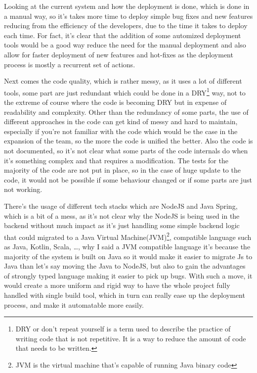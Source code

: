 Looking at the current system and how the deployment is done, which is done in a manual way,
so it's takes more time to deploy simple bug fixes and new features reducing from the efficiency
of the developers, due to the time it takes to deploy each time. For fact, it's clear that
the addition of some automized deployment tools would be a good way reduce the need for the
manual deployment and also allow for faster deployment of new features and hot-fixes as the
deployment process is mostly a recurrent set of actions.

Next comes the code quality, which is rather messy, as it uses a lot of different tools,
some part are just redundant which could be done in a DRY\footnote{DRY or don't repeat
yourself is a term used to describe the practice of writing code that is not repetitive.
It is a way to reduce the amount of code that needs to be written.\cite{pragmatic_bro}} way,
not to the extreme of course where the code is becoming DRY but in expense of readability
and complexity. Other than the redundancy of some parts, the use of different approaches
in the code can get kind of messy and hard to maintain, especially if you're not familiar
with the code which would be the case in the expansion of the team, so the more the code
is unified the better. Also the code is not documented, so it's not clear what some parts
of the code internals do when it's something complex and that requires a modification.
The tests for the majority of the code are not put in place, so in the case of huge update
to the code, it would not be possible if some behaviour changed or if some parts are just 
not working.

There's the usage of different tech stacks which are NodeJS and Java Spring, which is a bit
of a mess, as it's not clear why the NodeJS is being used in the backend without much impact
as it's just handling some simple backend logic that could migrated to a Java Virtual
Machine(JVM)\footnote{JVM is the virtual machine that's capable of running Java binary
code}, compatible language such as Java, Kotlin, Scala, \dots, why I said a JVM compatible
language it's because the majority of the system is built on Java so it would make it
easier to migrate Js to Java than let's say moving the Java to NodeJS, but also to gain
the advantages of strongly typed language making it easier to pick up bugs. With such a
move, it would create a more uniform and rigid way to have the whole project fully handled
with single build tool, which in turn can really ease up the deployment process, and make
it automatable more easily.

